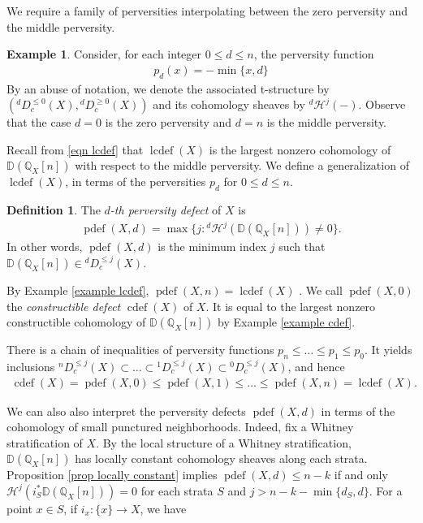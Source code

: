 \documentclass[11pt]{amsart}
\theoremstyle{definition}
\newtheorem{definition}[equation]{Definition}
\newtheorem{example}[equation]{Example}
\theoremstyle{plain}
\DeclareMathOperator{\lcdef}{lcdef}
\DeclareMathOperator{\cdef}{cdef}
\DeclareMathOperator{\pdef}{pdef}
\begin{document}
We require a family of perversities interpolating between the zero perversity and the middle perversity.

\begin{example}
Consider, for each integer $0 \leq d \leq n$, the perversity function
\begin{align*}
    p_d(x) = - \min \{ x, d\}
\end{align*}
By an abuse of notation, we denote the associated t-structure by $({}^{d} D_c^{\leq 0}(X), {}^{d} D_c^{\geq 0}(X))$ and its cohomology sheaves by ${}^d \mathcal{H}^j(-)$. Observe that the case $d=0$ is the zero perversity and $d = n$ is the middle perversity.
\end{example}

Recall from \ref{eqn lcdef} that $\lcdef(X)$ is the largest nonzero cohomology of $\mathbb{D}(\mathbb{Q}_X[n])$ with respect to the middle perversity. We define a generalization of $\lcdef(X)$, in terms of the perversities $p_d$ for $0 \leq d \leq n$.

\begin{definition}\label{defn pdef}
The \emph{$d$-th perversity defect} of $X$ is
\begin{align*}
    \pdef(X, d) = \max \{ j : {}^d\mathcal{H}^j( \mathbb{D}(\mathbb{Q}_X[n])) \neq 0 \}.
\end{align*}
In other words, $\pdef(X,d)$ is the minimum index $j$ such that $\mathbb{D}(\mathbb{Q}_X[n]) \in {}^d D_c^{\leq j}(X)$. 
\end{definition}

By Example \ref{example lcdef}, $\pdef(X,n) = \lcdef(X)$ . We call $\pdef(X, 0)$ the \emph{constructible defect} $\cdef(X)$ of $X$. It is equal to the largest nonzero constructible cohomology of $\mathbb{D}(\mathbb{Q}_X[n])$ by Example \ref{example cdef}.

There is a chain of inequalities of perversity functions $p_n \leq \ldots \leq p_1 \leq p_0$. It yields inclusions ${}^n D^{\leq j}_c(X) \subset \ldots \subset {}^1 D^{\leq j}_c(X) \subset {}^0 D^{\leq j}_c(X)$, and hence
\begin{align}\label{eqn inequality chain}
    \cdef(X) = \pdef(X, 0) \leq \pdef(X, 1) \leq \ldots \leq \pdef(X,n) = \lcdef(X).
\end{align}

We can also also interpret the perversity defects $\pdef(X,d)$ in terms of the cohomology of small punctured neighborhoods. Indeed, fix a Whitney stratification of $X$. By the local structure of a Whitney stratification, $\mathbb{D}(\mathbb{Q}_X[n])$ has locally constant cohomology sheaves along each strata. Proposition \ref{prop locally constant} implies $\pdef(X,d) \leq n-k$ if and only $\mathcal{H}^j(i_S^* \mathbb{D}( \mathbb{Q}_X[n]) ) = 0$ for each strata $S$ and $j > n-k  - \min \{ d_S, d\}$. For a point $x \in S$, if $i_x: \{ x\} \rightarrow X$, we have
\end{document}
